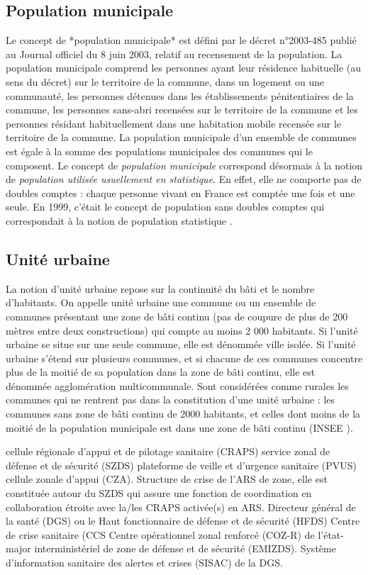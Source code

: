 \documentclass[12pt,english,french,twoside]{report}\usepackage[]{graphicx}\usepackage[]{color}
\begin{document}
\subsection*{Population municipale}
Le concept de *population municipale* est défini par le décret n°2003-485 publié au Journal officiel du 8 juin 2003, relatif au recensement de la population.
La population municipale comprend les personnes ayant leur résidence habituelle (au sens du décret) sur le territoire de la commune, dans un logement ou une communauté, les personnes détenues dans les établissements pénitentiaires de la commune, les personnes sans-abri recensées sur le territoire de la commune et les personnes résidant habituellement dans une habitation mobile recensée sur le territoire de la commune.
La population municipale d'un ensemble de communes est égale à la somme des populations municipales des communes qui le composent.
Le concept de \emph{population municipale} correspond désormais à la notion de \emph{population utilisée usuellement en statistique}. En effet, elle ne comporte pas de doubles comptes : chaque personne vivant en France est comptée une fois et une seule. En 1999, c'était le concept de population sans doubles comptes qui correspondait à la notion de population statistique \cite{6}.


\subsection*{Unité urbaine}
La notion d'unité urbaine repose sur la continuité du bâti et le nombre d'habitants. On appelle unité urbaine une commune ou un ensemble de communes présentant une zone de bâti continu (pas de coupure de plus de 200 mètres entre deux constructions) qui compte au moins 2 000 habitants.
Si l'unité urbaine se situe sur une seule commune, elle est dénommée ville isolée. Si l'unité urbaine s'étend sur plusieurs communes, et si chacune de ces communes concentre plus de la moitié de sa population dans la zone de bâti continu, elle est dénommée agglomération multicommunale.
Sont considérées comme rurales les communes qui ne rentrent pas dans la constitution d'une unité urbaine : les communes sans zone de bâti continu de 2000 habitants, et celles dont moins de la moitié de la population municipale est dans une zone de bâti continu (INSEE \cite{4}).

cellule régionale d’appui et de pilotage sanitaire (CRAPS)
service zonal de défense et de sécurité (SZDS)
plateforme de veille et d’urgence sanitaire (PVUS)
cellule zonale d’appui (CZA). Structure de crise de l’ARS de zone, elle est constituée autour du SZDS qui assure une fonction de coordination en collaboration étroite avec la/les CRAPS activée(s) en ARS.
Directeur général de la santé (DGS) ou le Haut fonctionnaire de défense et de sécurité (HFDS)
Centre de crise sanitaire (CCS
Centre opérationnel zonal renforcé (COZ-R) de l’état-major interministériel de zone de défense et de sécurité (EMIZDS).
Système d’information sanitaire des alertes et crises (SISAC) de la DGS.
\end{document}
